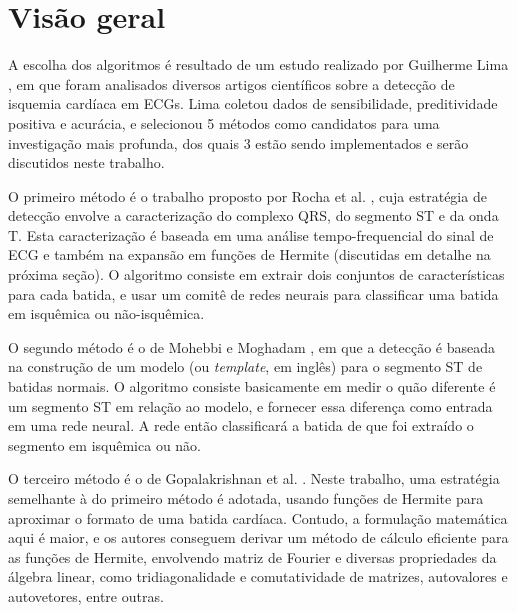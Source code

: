 
\section{Visão geral}
\label{sec:section1}

A escolha dos algoritmos é resultado de um estudo realizado por Guilherme Lima \cite{Lima01}, em que foram analisados diversos artigos científicos sobre a detecção de isquemia cardíaca em ECGs. Lima coletou dados de sensibilidade, preditividade positiva e acurácia, e selecionou 5 métodos como candidatos para uma investigação mais profunda, dos quais 3 estão sendo implementados e serão discutidos neste trabalho.

O primeiro método é o trabalho proposto por Rocha et al. \cite{Rocha10}, cuja estratégia de detecção envolve a caracterização do complexo QRS, do segmento ST e da onda T. Esta caracterização é baseada em uma análise tempo-frequencial do sinal de ECG e também na expansão em funções de Hermite (discutidas em detalhe na próxima seção). O algoritmo consiste em extrair dois conjuntos de características para cada batida, e usar um comitê de redes neurais para classificar uma batida em isquêmica ou não-isquêmica.

O segundo método é o de Mohebbi e Moghadam \cite{Mohebbi07}, em que a detecção é baseada na construção de um modelo (ou \emph{template}, em inglês) para o segmento ST de batidas normais. O algoritmo consiste basicamente em medir o quão diferente é um segmento ST em relação ao modelo, e fornecer essa diferença como entrada em uma rede neural. A rede então classificará a batida de que foi extraído o segmento em isquêmica ou não.

O terceiro método é o de Gopalakrishnan et al. \cite{Gopalak04}. Neste trabalho, uma estratégia semelhante à do primeiro método é adotada, usando funções de Hermite para aproximar o formato de uma batida cardíaca. Contudo, a formulação matemática aqui é maior, e os autores conseguem derivar um método de cálculo eficiente para as funções de Hermite, envolvendo matriz de Fourier e diversas propriedades da álgebra linear, como tridiagonalidade e comutatividade de matrizes, autovalores e autovetores, entre outras.